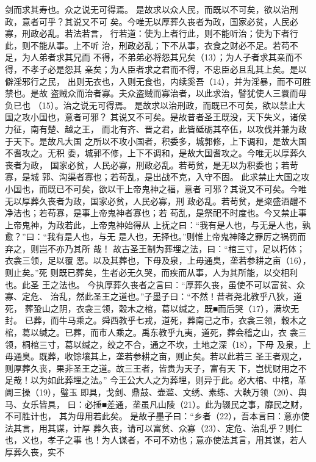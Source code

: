 \documentclass[12pt,UTF8]{ctexbook}
\begin{document}
剑而求其寿也。众之说无可得焉。 
是故求以众人民，而既以不可矣，欲以治刑政，意者可乎？其说又不可 
矣。今唯无以厚葬久丧者为政，国家必贫，人民必寡，刑政必乱。若法若言， 
行若道：使为上者行此，则不能听治；使为下者行此，则不能从事。上不听 
治，刑政必乱；下不从事，衣食之财必不足。若苟不足，为人弟者求其兄而 
不得，不弟弟必将怨其兄矣（13）；为人子者求其亲而不得，不孝子必是怨其 
亲矣；为人臣者求之君而不得，不忠臣必且乱其上矣。是以僻淫邪行之民， 
出则无衣也，入则无食也，内续奚吾（14），并为淫暴，而不可胜禁也。是故 
盗贼众而治者寡。夫众盗贼而寡治者，以此求治，譬犹使人三睘而毋负已也 
（15）。治之说无可得焉。 
是故求以治刑政，而既已不可矣，欲以禁止大国之攻小国也，意者可邪？ 
其说又不可矣。是故昔者圣王既没，天下失义，诸侯力征，南有楚、越之王， 
而北有齐、晋之君，此皆砥砺其卒伍，以攻伐并兼为政于天下。是故凡大国 
之所以不攻小国者，积委多，城郭修，上下调和，是故大国不耆攻之。无积 
委，城郭不修，上下不调和，是故大国耆攻之。今唯无以厚葬久丧者为政， 
国家必贫，人民必寡，刑政必乱。若苟贫，是无以为积委也；若苛寡，是城 
郭、沟渠者寡也；若苟乱，是出战不克，入守不固。 
此求禁止大国之攻小国也，而既已不可矣，欲以干上帝鬼神之福，意者 
可邪？其说又不可矣。今唯无以厚葬久丧者为政，国家必贫，人民必寡，刑 
政必乱。若苟贫，是粢盛酒醴不净洁也；若苟寡，是事上帝鬼神者寡也；若 
苟乱，是祭祀不时度也。今又禁止事上帝鬼神，为政若此，上帝鬼神始得从 
上抚之曰：“我有是人也，与无是人也，孰愈？”曰：“我有是人也，与无 
是人也，无择也。”则惟上帝鬼神降之罪厉之祸罚而弃之，则岂不亦乃其所 
哉！ 
故古圣王制为葬埋之法，曰：“棺三寸，足以朽体；衣衾三领，足以覆 
恶。以及其葬也，下毋及泉，上毋通臭，垄若参耕之亩（16），则止矣。”死 
则既已葬矣，生者必无久哭，而疾而从事，人为其所能，以交相利也。此圣 
王之法也。 
今执厚葬久丧者之言曰：“厚葬久丧，虽使不可以富贫、众寡、定危、 
治乱，然此圣王之道也。”子墨子曰：“不然！昔者尧北教乎八狄，道死， 
葬蛩山之阴，衣衾三领，穀木之棺，葛以缄之，既■而后哭（17），满坎无封。 
已葬，而牛马乘之。舜西教乎七戎，道死，葬南己之市，衣衾三领，穀木之 
棺，葛以缄之。已葬，而市人乘之。禹东教乎九夷，道死，葬会稽之山，衣 
衾三领，桐棺三寸，葛以缄之，绞之不合，通之不坎，土地之深（18），下毋 
及泉，上毋通臭。既葬，收馀壤其上，垄若参耕之亩，则止矣。若以此若三 
圣王者观之，则厚葬久丧，果非圣王之道。故三王者，皆贵为天子，富有天 
下，岂忧财用之不足哉！以为如此葬埋之法。” 
今王公大人之为葬埋，则异于此。必大棺、中棺，革阓三操（19），璧玉 
即具，戈剑、鼎鼓、壶滥、文绣、素练、大鞅万领（20）、舆马、女乐皆具， 
曰：必捶■差通，垄虽凡山陵（21）。此为辍民之事，靡民之财，不可胜计也， 
其为毋用若此矣。 
是故子墨子曰：“乡者（22），吾本言曰：意亦使法其言，用其谋，计厚 
葬久丧，请可以富贫、众寡（23）、定危、治乱乎？则仁也，义也，孝子之事 
也！为人谋者，不可不劝也；意亦使法其言，用其谋，若人厚葬久丧，实不 
\end{document}
